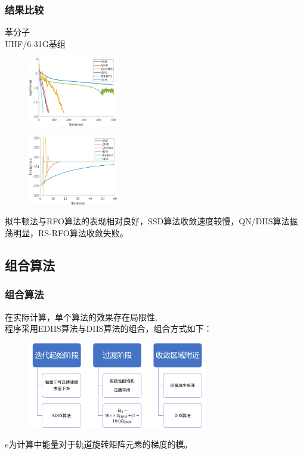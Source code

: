 \documentclass[10pt,aspectratio=43,mathserif,UTF8]{beamer}
\begin{document}
\begin{frame}
	\frametitle{结果比较}
	苯分子\\
	UHF/6-31G基组
	\begin{figure}[ht!]
		\centering
		\begin{minipage}{0.4\linewidth}
			\centering
			\includegraphics[height=3cm]{figure/benzene/NORM4.png}
			\label{fig:benzene:lognorm}
		\end{minipage}
		\begin{minipage}{0.4\linewidth}
			\centering
			\includegraphics[height=3cm]{figure/benzene/E6.png}
			\label{fig:benzene:E1}
		\end{minipage}
	\end{figure}
	拟牛顿法与RFO算法的表现相对良好，SSD算法收敛速度较慢，QN/DIIS算法振荡明显，RS-RFO算法收敛失败。
\end{frame}
\subsection{组合算法}
\begin{frame}
	\frametitle{组合算法}
	在实际计算，单个算法的效果存在局限性,\\
	程序采用EDIIS算法与DIIS算法的组合，组合方式如下：
	
	\begin{figure}[htbp]
		\centering
		\includegraphics[width=0.7\textwidth]{figure/HF/idea2.png}
	\end{figure}
	
	$e$为计算中能量对于轨道旋转矩阵元素的梯度的模。

	
\end{frame}
\end{document}
